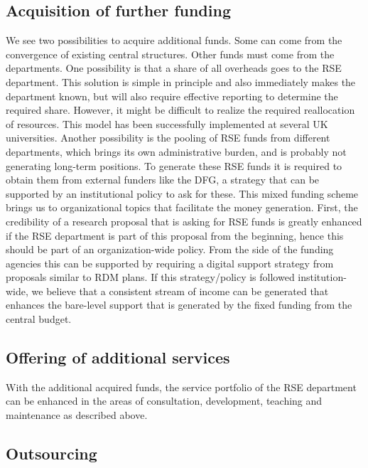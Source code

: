 \documentclass{article}
\begin{document}
\subsection{Acquisition of further funding}

We see two possibilities to acquire additional funds.
Some can come from the convergence of existing central structures.
Other funds must come from the departments.
One possibility is that a share of all overheads goes to the RSE department.
This solution is simple in principle and also immediately makes the department known, but will also require effective reporting to determine the required share.
However, it might be difficult to realize the required reallocation of resources.
This model has been successfully implemented at several UK universities.
Another possibility is the pooling of RSE funds from different departments, which brings its own administrative burden, and is probably not generating long-term positions.
To generate these RSE funds it is required to obtain them from external funders like the DFG, a strategy that can be supported by an institutional policy to ask for these.
This mixed funding scheme brings us to organizational topics that facilitate the money generation.
First, the credibility of a research proposal that is asking for RSE funds is greatly enhanced if the RSE department is part of this proposal from the beginning, hence this should be part of an organization-wide policy.
From the side of the funding agencies this can be supported by requiring a digital support strategy from proposals similar to RDM plans.
If this strategy/policy is followed institution-wide, we believe that a consistent stream of income can be generated that enhances the bare-level support that is generated by the fixed funding from the central budget.

\subsection{Offering of additional services}

With the additional acquired funds, the service portfolio of the RSE department can be enhanced in the areas of consultation, development, teaching and maintenance as described above.

\subsection{Outsourcing}
\end{document}
